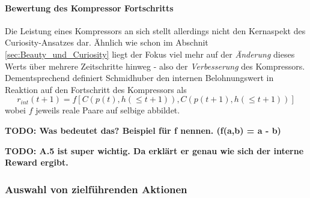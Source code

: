 \paragraph{Bewertung des Kompressor Fortschritts}
Die Leistung eines Kompressors an sich stellt allerdings nicht den Kernaspekt des Curiosity-Ansatzes dar. Ähnlich wie schon im Abschnit \ref{sec:Beauty_und_Curiosity} liegt der Fokus viel mehr auf der \emph{Änderung} dieses Werts über mehrere Zeitschritte hinweg - also der \emph{Verbesserung} des Kompressors.
Dementsprechend definiert Schmidhuber den internen Belohnungswert in Reaktion auf den Fortschritt des Kompressors als 
\begin{equation}
  r_{int}(t+1) = f\left[C(p(t),h(\leq t+1)), C(p(t+1),h(\leq t+1))\right]  
\end{equation}
wobei \(f\) jeweils reale Paare auf selbige abbildet. \cite[p.~19]{curiosity_schmidhuber}

\textbf{TODO: Was bedeutet das? Beispiel für f nennen. (f(a,b) = a - b)}

\textbf{TODO: A.5 ist super wichtig. Da erklärt er genau wie sich der interne Reward ergibt.}
\subsubsection{Auswahl von zielführenden Aktionen}

